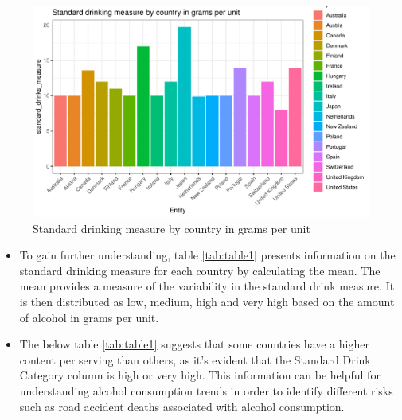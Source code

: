 \documentclass[11pt,a4paper,]{article}
\providecommand{\tightlist}{%
  \setlength{\itemsep}{0pt}\setlength{\parskip}{0pt}}
\begin{document}
\begin{figure}

{\centering \includegraphics[width=0.7\linewidth]{alcohol_analysis_files/figure-latex/std-alc-1} 

}

\caption{Standard drinking measure by country in grams per unit}\label{fig:std-alc}
\end{figure}

\begin{itemize}
\tightlist
\item
  To gain further understanding, table \ref{tab:table1} presents information on the standard drinking measure for each country by calculating the mean. The mean provides a measure of the variability in the standard drink measure. It is then distributed as low, medium, high and very high based on the amount of alcohol in grams per unit.
\item
  The below table \ref{tab:table1} suggests that some countries have a higher content per serving than others, as it's evident that the Standard Drink Category column is high or very high. This information can be helpful for understanding alcohol consumption trends in order to identify different risks such as road accident deaths associated with alcohol consumption.
  \pagebreak
\end{itemize}
\end{document}
